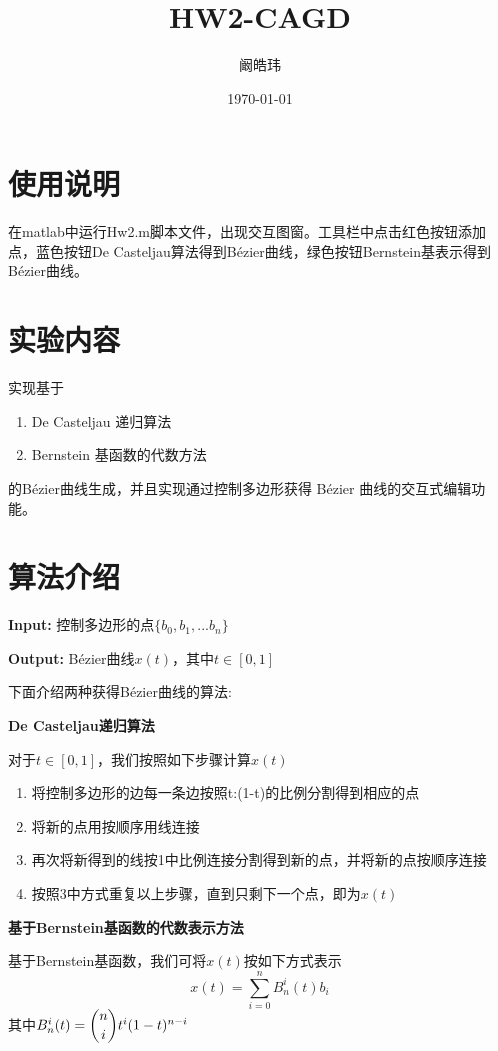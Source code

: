 \documentclass[12pt]{article}
\begin{document}
\title {HW2-CAGD}
\date{\today}
\author{阚皓玮}
\maketitle
\section{使用说明}
在matlab中运行Hw2.m脚本文件，出现交互图窗。工具栏中点击红色按钮添加点，蓝色按钮De Casteljau算法得到Bézier曲线，绿色按钮Bernstein基表示得到Bézier曲线。

\section{实验内容}
\noindent 实现基于
\begin{enumerate}[itemsep= -6 pt,topsep = 0 pt]
    \item De Casteljau 递归算法
    \item Bernstein 基函数的代数方法
\end{enumerate}
的Bézier曲线生成，并且实现通过控制多边形获得 Bézier 曲线的交互式编辑功能。

\section{算法介绍}
 {\bf Input:}  控制多边形的点$\{b_0,b_1,...b_n\}$

{\bf Output:} Bézier曲线$x(t)$，其中$t\in[0,1]$

\noindent 下面介绍两种获得Bézier曲线的算法:

{\noindent\large \bf De Casteljau递归算法}

对于$t\in[0,1]$，我们按照如下步骤计算$x(t)$
\begin{enumerate}[itemsep= -6 pt,topsep = 0 pt]
    \item 将控制多边形的边每一条边按照t:(1-t)的比例分割得到相应的点
    \item 将新的点用按顺序用线连接
    \item 再次将新得到的线按1中比例连接分割得到新的点，并将新的点按顺序连接
    \item 按照3中方式重复以上步骤，直到只剩下一个点，即为$x(t)$
\end{enumerate}
{\noindent\large \bf 基于Bernstein基函数的代数表示方法}

基于Bernstein基函数，我们可将$x(t)$按如下方式表示
$$
    \displaystyle x(t)=\sum_{i=0}^nB_n^i(t)b_i
$$
其中$B_n^i(t)=\dbinom{n}{i}t^i(1-t)^{n-i}$
\end{document}
